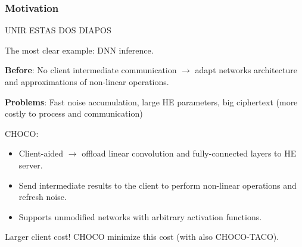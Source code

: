 \documentclass[10pt,handout]{beamer}
\begin{document}
\begin{frame}
\frametitle{Motivation}


UNIR ESTAS DOS DIAPOS

The most clear example: DNN inference.

    \textbf{Before}: No client intermediate communication $\rightarrow$ adapt networks architecture and approximations of non-linear operations.

    \textbf{Problems}: Fast noise accumulation, large HE parameters, big ciphertext (more costly to process and communication)

CHOCO:
\begin{itemize}
    \vspace{-0.2cm}  \item Client-aided $\rightarrow$ offload linear convolution and fully-connected layers to HE server.
    \vspace{-0.2cm}\item Send intermediate results to the client to perform non-linear operations and refresh noise.
    \vspace{-0.2cm}\item Supports unmodified networks with arbitrary activation functions.
\end{itemize}

Larger client cost!
CHOCO minimize this cost (with also CHOCO-TACO).

\end{frame}


\end{document}
